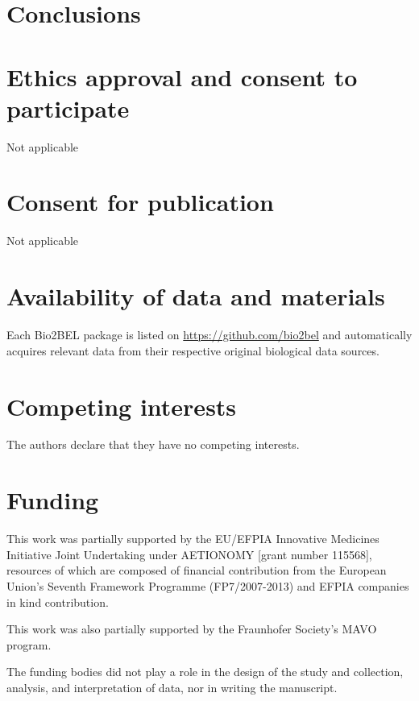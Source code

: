 \documentclass{bmcart}
\begin{document}
\section*{Conclusions}



\begin{backmatter}

\section*{Ethics approval and consent to participate}
Not applicable

\section*{Consent for publication}
Not applicable

\section*{Availability of data and materials}
Each Bio2BEL package is listed on \url{https://github.com/bio2bel} and automatically acquires relevant data from their respective original biological data sources.

\section*{Competing interests}
The authors declare that they have no competing interests.

\section*{Funding}
This work was partially supported by the EU/EFPIA Innovative Medicines Initiative Joint Undertaking under AETIONOMY [grant number 115568], resources of which are composed of financial contribution from the European Union's Seventh Framework Programme (FP7/2007-2013) and EFPIA companies in kind contribution.

This work was also partially supported by the Fraunhofer Society's MAVO program.

The funding bodies did not play a role in the design of the study and collection, analysis, and interpretation of data, nor in writing the manuscript.


\end{backmatter}
\end{document}
